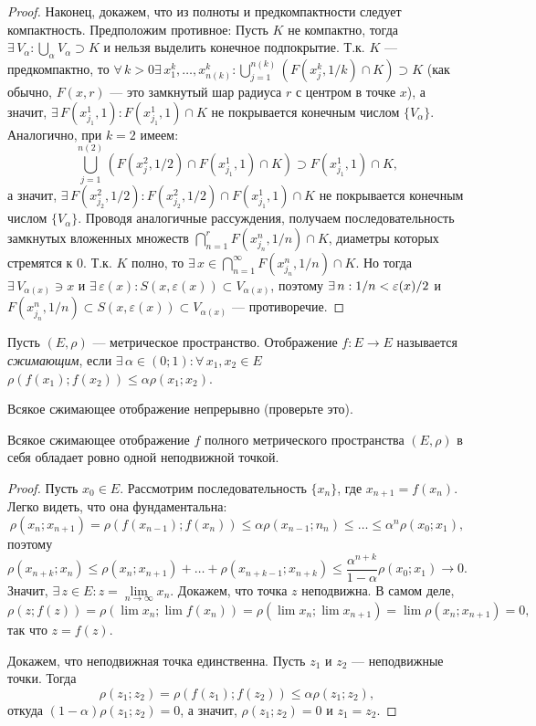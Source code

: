 \documentclass[10pt,titlepage, a4paper]{article}
\begin{document}
\begin{proof}
Наконец, докажем, что из полноты и предкомпактности следует
компактность. Предположим противное: Пусть $K$ не компактно, тогда
$\exists\,V_\alpha: \bigcup\limits_\alpha V_\alpha\supset K$ и
нельзя выделить конечное подпокрытие. Т.к. $K$ --- предкомпактно, то
$\forall\,k>0$\;\;$\exists\,x_1^k,\ldots,x_{n(k)}^k:\bigcup\limits_
{j=1}^{n(k)}(F(x_j^k,1/k)\cap K)\supset K$ (как обычно, $F(x,r)$
--- это замкнутый шар радиуса $r$ с центром в точке $x$), а значит,
$\exists\,F(x_{j_1}^1,1):F(x_{j_1}^1,1)\cap K$ не покрывается
конечным числом $\{V_\alpha\}$. Аналогично, при $k=2$ имеем:
$$\bigcup\limits_{j=1}^{n(2)} (F(x_j^2,1/2)\cap F(x_{j_1}^1,1)\cap K)\supset F(x_{j_1}^1,1)
\cap K,$$ а значит, $\exists\,F(x_{j_2}^2,1/2):F(x_{j_2}^2,1/2)\cap
F(x_{j_1}^1,1)\cap K$ не покрывается конечным числом $\{V_\alpha\}$.
Проводя аналогичные рассуждения, получаем последовательность
замкнутых вложенных множеств $\bigcap\limits_{n=1}^r
F(x^n_{j_n},1/n)\cap K$, диаметры которых стремятся к 0. Т.к. $K$
полно, то $\exists\,x\in\bigcap\limits_{n=1}^\infty
F(x_{j_n}^n,1/n)\cap K$. Но тогда $\exists\,V_{\alpha(x)}\ni x$ и
$\exists\,\varepsilon(x): S(x,\varepsilon(x))\subset V_{\alpha(x)}$,
поэтому $\exists\,n: 1/n\p<\varepsilon(x)/2$ и
$F(x_{j_n}^n,1/n)\subset S(x,\varepsilon(x))\subset V_{\alpha(x)}$
--- противоречие.
\end{proof}

\begin{defen}
Пусть $(E,\rho)$ --- метрическое пространство. Отображение $f\colon
E\to E$ называется \emph{сжимающим}, если
$\exists\,\alpha\in(0;1):\forall\,x_1,x_2\in E$ \;\;
$\rho(f(x_1);f(x_2))\leqslant\alpha\rho(x_1;x_2)$.
\end{defen}

Всякое сжимающее отображение непрерывно (проверьте это).

\begin{theorem}[Пикар]
Всякое сжимающее отображение $f$ полного ме\-трического пространства
$(E,\rho)$ в себя обладает ровно одной неподвижной точкой.
\end{theorem}

\begin{proof}
Пусть $x_0\in E$. Рассмотрим последовательность $\{x_n\}$, где
$x_{n+1}=f(x_n)$. Легко видеть, что она фундаментальна:
$$\rho(x_{n};x_{n+1})=\rho(f(x_{n-1});f(x_n))\leqslant\alpha\rho(x_{n-1};n_n)
\leqslant\ldots\leqslant\alpha^n\rho(x_0;x_1),$$ поэтому
$$\rho(x_{n+k};x_n)\leqslant\rho(x_n;x_{n+1})+\ldots+\rho(x_{n+k-1};x_{n+k})
\leqslant\frac{\alpha^{n+k}}{1-\alpha}\rho(x_0;x_1)\to 0.$$ Значит,
$\exists\,z\in E:z=\lim\limits_{n\to\infty} x_n$. Докажем, что точка
$z$ неподвижна. В самом деле, $$\rho(z;f(z))=\rho(\lim x_n;\lim
f(x_n))=\rho(\lim x_n;\lim x_{n+1})=\lim\rho(x_n;x_{n+1})=0,$$ так
что $z=f(z)$.

Докажем, что неподвижная точка единственна. Пусть $z_1$ и $z_2$ ---
неподвижные точки. Тогда
$$\rho(z_1;z_2)=\rho(f(z_1);f(z_2))\leqslant\alpha\rho(z_1;z_2),$$
откуда $(1-\alpha)\rho(z_1;z_2)=0$, а значит, $\rho(z_1;z_2)=0$ и
$z_1=z_2$.
\end{proof}
\end{document}
